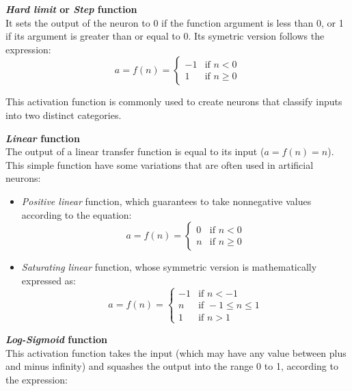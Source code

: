 \begin{description}
	\item{\textbf{\emph{Hard limit} or \emph{Step} function}\hfill \\
	It sets the output of the neuron to 0 if the function argument is less than 0, or 1 if its argument is greater than or equal to 0. Its symetric version follows the expression:
		\begin{equation}
		a = f(n) =
  			\begin{cases}
    			-1 & \text{if } n < 0\\
    			1 & \text{if } n \geq 0
  			\end{cases}
		\label{eq:hardlimit}
		\end{equation}

	This activation function is commonly used to create neurons that classify inputs into two distinct categories.
	}
	\item{\textbf{\emph{Linear} function}\hfill \\
	The output of a linear transfer function is equal to its input ($a=f(n)=n$). This simple function have some variations that are often used in artificial neurons:
	\begin{itemize}
		\item \emph{Positive linear} function, which guarantees to take nonnegative values according to the equation:
		\begin{equation}
		a = f(n) =
  			\begin{cases}
    			0 & \text{if } n < 0\\
    			n & \text{if } n \geq 0
  			\end{cases}
		\label{eq:positivelinear}
		\end{equation}

		\item \emph{Saturating linear} function, whose symmetric version is mathematically expressed as:
		\begin{equation}
		a = f(n) =
  			\begin{cases}
    			-1 & \text{if } n < -1\\
    			n & \text{if } -1 \leq n \leq 1\\
    			1 & \text{if } n > 1
  			\end{cases}
		\label{eq:saturatinglinear}
		\end{equation}
	\end{itemize}
	}
	\item{\textbf{\emph{Log-Sigmoid} function}\hfill \\
	This activation function takes the input (which may have any value between plus and minus infinity) and squashes the output into the range 0 to 1, according to the expression:

}
\end{description}

